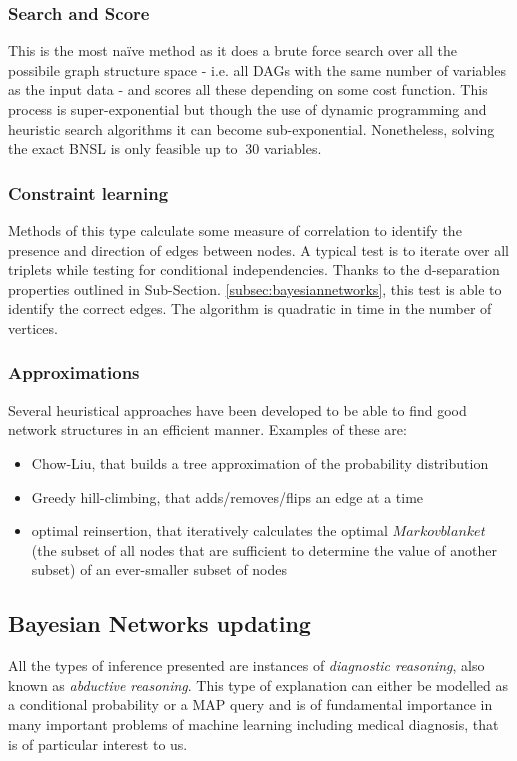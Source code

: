 \subsubsection{Search and Score}
This is the most na{\"i}ve method as it does a brute force search over all the possibile graph structure space - i.e. all DAGs with the same number of variables as the input data - and scores all these depending on some cost function.
This process is super-exponential but though the use of dynamic programming and heuristic search algorithms it can become sub-exponential.
Nonetheless, solving the exact BNSL is only feasible up to $~ 30$ variables.

\subsubsection{Constraint learning}
Methods of this type calculate some measure of correlation to identify the presence and direction of edges between nodes.
A typical test is to iterate over all triplets while testing for conditional independencies.
Thanks to the d-separation properties outlined in Sub-Section. \ref{subsec:bayesiannetworks}, this test is able to identify the correct edges.
The algorithm is quadratic in time in the number of vertices.

\subsubsection{Approximations}
Several heuristical approaches have been developed to be able to find good network structures in an efficient manner.
Examples of these are:
\begin{itemize}
  \item Chow-Liu, that builds a tree approximation of the probability distribution
  \item Greedy hill-climbing, that adds/removes/flips an edge at a time
  \item optimal reinsertion, that iteratively calculates the optimal $Markov blanket$ (the subset of all nodes that are sufficient to determine the value of another subset) of an ever-smaller subset of nodes
\end{itemize}

\subsection{Bayesian Networks updating} \label{subsec:bnupdating}
All the types of inference presented are instances of \textit{diagnostic reasoning}, also known as \textit{abductive reasoning}.  
This type of explanation can either be modelled as a conditional probability or a MAP query and is of fundamental importance in many important problems of machine learning including medical diagnosis, that is of particular interest to us.

